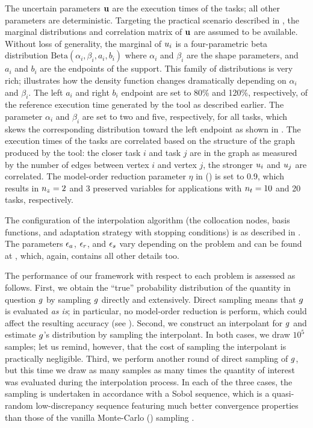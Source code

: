 
The uncertain parameters $\mathbf{u}$ are the execution times of the tasks; all other
parameters are deterministic. Targeting the practical scenario described in
, the marginal distributions and correlation matrix of $\mathbf{u}$
are assumed to be available. Without loss of generality, the marginal of $u_i$
is a four-parametric beta distribution $\text{Beta}(\alpha_i, \beta_i, a_i,
b_i)$ where $\alpha_i$ and $\beta_i$ are the shape parameters, and $a_i$ and
$b_i$ are the endpoints of the support. This family of distributions is very
rich;  illustrates how the density function changes
dramatically depending on $\alpha_i$ and $\beta_i$. The left $a_i$ and right
$b_i$ endpoint are set to 80\% and 120\%, respectively, of the reference
execution time generated by the  tool as described earlier. The
parameter $\alpha_i$ and $\beta_i$ are set to two and five, respectively, for
all tasks, which skews the corresponding distribution toward the left endpoint
as shown in . The execution times of the tasks are correlated
based on the structure of the graph produced by the  tool: the closer
task $i$ and task $j$ are in the graph as measured by the number of edges
between vertex $i$ and vertex $j$, the stronger $u_i$ and $u_j$ are
correlated. The model-order reduction parameter $\eta$ in 
() is set to 0.9, which results in ${n_z} = 2$ and 3 preserved
variables for applications with ${n_t} = 10$ and 20 tasks, respectively.

The configuration of the interpolation algorithm (the collocation nodes, basis
functions, and adaptation strategy with stopping conditions) is as described in
. The parameters $\epsilon_a$, $\epsilon_r$, and $\epsilon_s$ vary
depending on the problem and can be found at \cite{sources}, which, again,
contains all other details too.

The performance of our framework with respect to each problem is assessed as
follows. First, we obtain the ``true'' probability distribution of the quantity
in question $g$ by sampling $g$ directly and extensively. Direct sampling
means that $g$ is evaluated \emph{as is}; in particular, no model-order
reduction is perform, which could affect the resulting accuracy (see
). Second, we construct an interpolant for $g$ and estimate
$g$'s distribution by sampling the interpolant. In both cases, we draw $10^5$
samples; let us remind, however, that the cost of sampling the interpolant is
practically negligible. Third, we perform another round of direct sampling of
$g$, but this time we draw as many samples as many times the quantity of
interest was evaluated during the interpolation process. In each of the three
cases, the sampling is undertaken in accordance with a Sobol sequence, which is
a quasi-random low-discrepancy sequence featuring much better convergence
properties than those of the vanilla Monte-Carlo () sampling
\cite{joe2008}.

